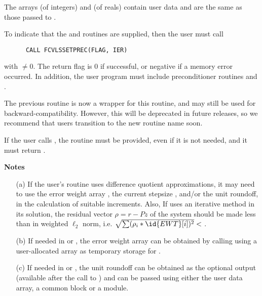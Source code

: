 \begin{Steps}
  The arrays  (of integers) and  (of reals) contain user data
  and are the same as those passed to .

  To indicate that the  and  routines are
  supplied, then the user must call 
\begin{verbatim}
      CALL FCVLSSETPREC(FLAG, IER)
\end{verbatim}
  with  $\neq 0$.  The return flag  is 0 if
  successful, or negative if a memory error occurred.
  In addition, the user program must include
  preconditioner routines  and .

  The previous routine  is now a wrapper for this
  routine, and may still be used for backward-compatibility.  However,
  this will be deprecated in future releases, so we recommend that
  users transition to the new routine name soon.
  
  {\warn}If the user calls , the routine  must
  be provided, even if it is not needed, and it must return .

  {\bf Notes} 
  \begin{itemize}
  \item[(a) ] If the user's  routine uses difference
    quotient approximations, it may need to use the error weight array
    , the current stepsize , and/or the unit roundoff,
    in the calculation of suitable increments.  Also, If 
    uses an iterative method in its solution, the residual vector
    $\rho = r - Pz$ of the system should be made less than 
    in weighted $\ell_2$ norm, i.e. $\sqrt{\sum(\rho_i *
      \id{EWT}[i])^2} < $ . 
  \item[(b) ] If needed in  or , the error
    weight array  can be obtained by calling
     using a user-allocated array as temporary
    storage for .
  \item[(c) ] If needed in  or , the unit
    roundoff can be obtained as the optional output 
    (available after the call to ) and can be passed
    using either the  user data array, a common block or a
    module.
  \end{itemize}
  
  


\end{Steps}

